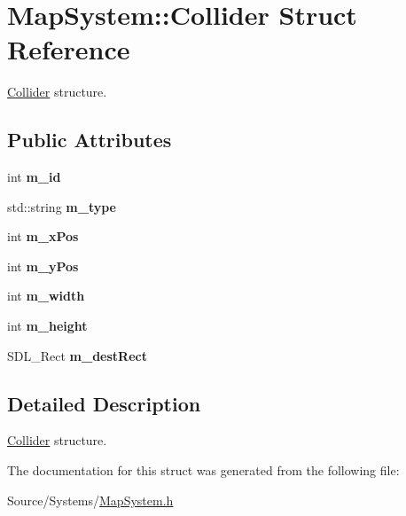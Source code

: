 \hypertarget{struct_map_system_1_1_collider}{}\section{Map\+System\+:\+:Collider Struct Reference}
\label{struct_map_system_1_1_collider}


\mbox{\hyperlink{struct_map_system_1_1_collider}{Collider}} structure.  


\subsection*{Public Attributes}
\begin{DoxyCompactItemize}
\item 
\mbox{\label{struct_map_system_1_1_collider_a8b6d352f29974ab53bda9592489f438b}} 
int {\bfseries m\+\_\+id}
\item 
\mbox{\label{struct_map_system_1_1_collider_a634b095323d7c6fe9a4f8ac15c01ef9d}} 
std\+::string {\bfseries m\+\_\+type}
\item 
\mbox{\label{struct_map_system_1_1_collider_acc6d3edbe21d405444599211c096baaa}} 
int {\bfseries m\+\_\+x\+Pos}
\item 
\mbox{\label{struct_map_system_1_1_collider_a98b698c6b46ebbb105325567e871b574}} 
int {\bfseries m\+\_\+y\+Pos}
\item 
\mbox{\label{struct_map_system_1_1_collider_a61ed8b6fb582a4978ac9ecebcae60e77}} 
int {\bfseries m\+\_\+width}
\item 
\mbox{\label{struct_map_system_1_1_collider_ae122a409ea44d81a26bb407377748a9a}} 
int {\bfseries m\+\_\+height}
\item 
\mbox{\label{struct_map_system_1_1_collider_a13eea948e170d38b0b4a64915bc088e9}} 
S\+D\+L\+\_\+\+Rect {\bfseries m\+\_\+dest\+Rect}
\end{DoxyCompactItemize}


\subsection{Detailed Description}
\mbox{\hyperlink{struct_map_system_1_1_collider}{Collider}} structure. 

The documentation for this struct was generated from the following file\+:\begin{DoxyCompactItemize}
\item 
Source/\+Systems/\mbox{\hyperlink{_map_system_8h}{Map\+System.\+h}}\end{DoxyCompactItemize}

